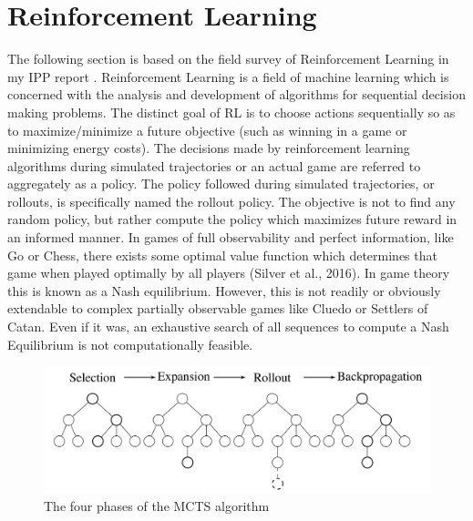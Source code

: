 \documentclass[msc, deptreport, ai, romanprepages]{infthesis}
\begin{document}
\section{Reinforcement Learning}
The following section is based on the field survey of Reinforcement Learning in my IPP report \cite{IPP}. Reinforcement Learning is a field of machine learning which is concerned with the analysis and development of algorithms for sequential decision making problems. The distinct goal of RL is to choose actions sequentially so as to maximize/minimize a future objective (such as winning in a game or minimizing energy costs). The decisions made by reinforcement learning algorithms during simulated trajectories or an actual game are referred to aggregately as a policy. The policy followed during simulated trajectories, or rollouts, is specifically named the rollout policy. The objective is not to find any random policy, but rather compute the policy which maximizes future reward in an informed manner. In games of full observability and perfect information, like Go or Chess, there exists some optimal value function which determines that game when played optimally by all players (Silver et al., 2016). In game theory this is known as a Nash equilibrium. However, this is not readily or obviously extendable to complex partially observable games like Cluedo or Settlers of Catan. Even if it was, an exhaustive search of all sequences to compute a Nash Equilibrium is not computationally feasible. 
\begin{figure}[h]
\caption{The four phases of the MCTS algorithm}
\centering
\includegraphics[scale=.825]{figures/MCTS}
\end{figure}
\end{document}
